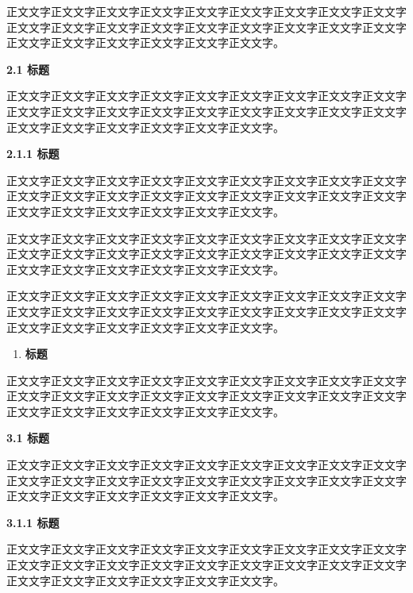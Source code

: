 \documentclass[
]{article}
\begin{document}
正文文字正文文字正文文字正文文字正文文字正文文字正文文字正文文字正文文字正文文字正文文字正文文字正文文字正文文字正文文字正文文字正文文字正文文字正文文字正文文字正文文字正文文字正文文字正文文字。

\protect{}\label{_Toc4287}{}\textbf{2.1 标题}

正文文字正文文字正文文字正文文字正文文字正文文字正文文字正文文字正文文字正文文字正文文字正文文字正文文字正文文字正文文字正文文字正文文字正文文字正文文字正文文字正文文字正文文字正文文字正文文字。

\protect{}\label{_Toc12161_WPSOffice_Level3}{}\textbf{2.1.1
标题}

正文文字正文文字正文文字正文文字正文文字正文文字正文文字正文文字正文文字正文文字正文文字正文文字正文文字正文文字正文文字正文文字正文文字正文文字正文文字正文文字正文文字正文文字正文文字正文文字。

正文文字正文文字正文文字正文文字正文文字正文文字正文文字正文文字正文文字正文文字正文文字正文文字正文文字正文文字正文文字正文文字正文文字正文文字正文文字正文文字正文文字正文文字正文文字正文文字。

正文文字正文文字正文文字正文文字正文文字正文文字正文文字正文文字正文文字正文文字正文文字正文文字正文文字正文文字正文文字正文文字正文文字正文文字正文文字正文文字正文文字正文文字正文文字正文文字。

\begin{enumerate}
\def\labelenumi{\arabic{enumi}.}
\setcounter{enumi}{2}
\item
  \textbf{\hfill\break
  }\protect{}\label{_Toc18030}{}\textbf{标题}
\end{enumerate}

正文文字正文文字正文文字正文文字正文文字正文文字正文文字正文文字正文文字正文文字正文文字正文文字正文文字正文文字正文文字正文文字正文文字正文文字正文文字正文文字正文文字正文文字正文文字正文文字。

\protect{}\label{_Toc7093_WPSOffice_Level2}{}\textbf{3.1
标题}

正文文字正文文字正文文字正文文字正文文字正文文字正文文字正文文字正文文字正文文字正文文字正文文字正文文字正文文字正文文字正文文字正文文字正文文字正文文字正文文字正文文字正文文字正文文字正文文字。

\protect{}\label{_Toc7714}{}\textbf{3.1.1 标题}

正文文字正文文字正文文字正文文字正文文字正文文字正文文字正文文字正文文字正文文字正文文字正文文字正文文字正文文字正文文字正文文字正文文字正文文字正文文字正文文字正文文字正文文字正文文字正文文字。
\end{document}
